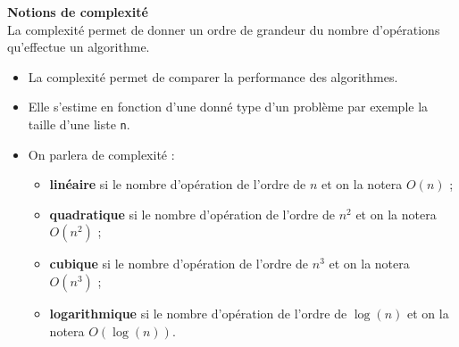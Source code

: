 \begin{defi}\small{\textbf{\textsf{Notions de complexité}}}~\\
La complexité permet de donner un ordre de grandeur du nombre d'opérations qu'effectue un algorithme.
\begin{itemize}
\item La complexité permet de comparer la performance des algorithmes.
\item Elle s'estime en fonction d'une donné type d'un problème par exemple la taille d'une liste \texttt{n}.
\item On parlera de complexité : 
\begin{itemize}
\item \textbf{linéaire} si le nombre d'opération de l'ordre de $n$ et on la notera $O(n)$ ;
\item \textbf{quadratique} si le nombre d'opération de l'ordre de $n^2$ et on la notera $O(n^2)$ ;
\item \textbf{cubique} si le nombre d'opération de l'ordre de $n^3$ et on la notera $O(n^3)$ ;
\item \textbf{logarithmique} si le nombre d'opération de l'ordre de $\log(n)$ et on la notera $O(\log(n))$.
\end{itemize}
\end{itemize}
\end{defi}

